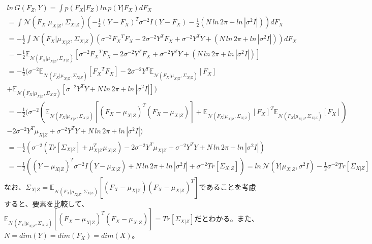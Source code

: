 \documentclass{jsarticle}
\begin{document}
\begin{equation}
\begin{split}
ln \, G(F_Z, Y) = \int p(F_X | F_Z) ln \, p(Y | F_X) dF_X\\
= \int  \mathcal{N}(F_X | \mu_{X | Z}, \Sigma_{X | Z}) (-\frac{1}{2}(Y - F_X)^T\sigma^{-2}I(Y - F_X) - \frac{1}{2}(N \, ln \, 2\pi + ln \, |\sigma^2 I|)) dF_X\\
= -\frac{1}{2} \int  \mathcal{N}(F_X | \mu_{X | Z}, \Sigma_{X | Z}) (\sigma^{-2}{F_X}^T F_X - 2\sigma^{-2}Y^T F_X + \sigma^{-2} Y^T Y + (N \, ln \, 2\pi + ln \, |\sigma^2 I|)) dF_X \\
= -\frac{1}{2} \mathbb{E}_{\mathcal{N}(F_X | \mu_{X | Z}, \Sigma_{X | Z})}[\sigma^{-2}{F_X}^T F_X - 2\sigma^{-2}Y^T F_X + \sigma^{-2} Y^T Y + (N \, ln \, 2\pi + ln \, |\sigma^2 I|)]\\
= -\frac{1}{2} (\sigma^{-2} \mathbb{E}_{\mathcal{N}(F_X | \mu_{X | Z}, \Sigma_{X | Z})}[{F_X}^T F_X] - 2\sigma^{-2}Y^T \mathbb{E}_{\mathcal{N}(F_X | \mu_{X | Z}, \Sigma_{X | Z})}[F_X]\\ + \mathbb{E}_{\mathcal{N}(F_X | \mu_{X | Z}, \Sigma_{X | Z})}[\sigma^{-2} Y^T Y + N \, ln \, 2\pi + ln \, |\sigma^2 I|])\\
= -\frac{1}{2} (\sigma^{-2} (\mathbb{E}_{\mathcal{N}(F_X | \mu_{X | Z}, \Sigma_{X | Z})}[(F_X - \mu_{X|Z})^T (F_X - \mu_{X|Z})] + \mathbb{E}_{\mathcal{N}(F_X | \mu_{X | Z}, \Sigma_{X | Z})}[F_X]^T \mathbb{E}_{\mathcal{N}(F_X | \mu_{X | Z}, \Sigma_{X | Z})}[F_X])\\
 - 2\sigma^{-2}Y^T \mu_{X | Z}  + \sigma^{-2} Y^T Y + N \, ln \, 2\pi + ln \, |\sigma^2 I|)\\
= -\frac{1}{2} (\sigma^{-2} (Tr[\Sigma_{X | Z}] + \mu_{X | Z}^T \mu_{X | Z}) - 2\sigma^{-2}Y^T \mu_{X | Z}  + \sigma^{-2} Y^T Y + N \, ln \, 2\pi + ln \, |\sigma^2 I|)\\
= -\frac{1}{2} ((Y - \mu_{X | Z})^T \sigma^{-2} I (Y - \mu_{X | Z}) + N \, ln \, 2\pi + ln \, |\sigma^2 I| + \sigma^{-2} Tr[\Sigma_{X | Z}])
= ln \, \mathcal{N}(Y | \mu_{X | Z}, \sigma^2 I) - \frac{1}{2}\sigma^{-2} Tr[\Sigma_{X | Z}]
\end{split}
\end{equation}
なお、$\Sigma_{X|Z} = \mathbb{E}_{\mathcal{N}(F_X | \mu_{X | Z}, \Sigma_{X | Z})}[(F_X - \mu_{X | Z})(F_X - \mu_{X | Z})^T]$であることを考慮すると、要素を比較して、$\mathbb{E}_{\mathcal{N}(F_X | \mu_{X | Z}, \Sigma_{X | Z})}[(F_X - \mu_{X | Z})^T (F_X - \mu_{X | Z})] = Tr[\Sigma_{X|Z}]$だとわかる。また、$N = dim(Y) = dim(F_X) = dim(X)$。
\end{document}
